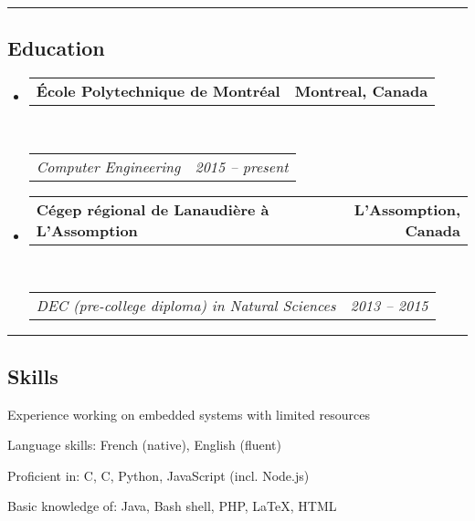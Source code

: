 \documentclass[11pt,a4paper]{article}
\makeatletter
\newenvironment{indentsection}[1]%
{\begin{list}{}%
	{\setlength{\leftmargin}{#1}}%
	\item[]%
}
{\end{list}}
\newcommand{\headerrow}[2]
{\begin{tabular*}{\linewidth}{l@{\extracolsep{\fill}}r}
	#1 &
	#2 \\
\end{tabular*}}
\newcommand{\Cplusplus}
{C\nolinebreak[4]\hspace{-.05em}\raisebox{.22ex}{\footnotesize\bf ++}}
\makeatother
\begin{document}
\hrule
\vspace{-0.4em}
\subsection*{Education}

\begin{itemize}
	\parskip=0.1em

	\item 
	\headerrow
		{\textbf{École Polytechnique de Montréal}}
		{\textbf{Montreal, Canada}}
	\\
	\headerrow
		{\emph{Computer Engineering}}
		{\emph{2015 -- present}}
	
	\item 
	\headerrow
		{\textbf{Cégep régional de Lanaudière à L'Assomption}}
		{\textbf{L'Assomption, Canada}}
	\\
	\headerrow
		{\emph{DEC (pre-college diploma) in Natural Sciences}}
		{\emph{2013 -- 2015}}

\end{itemize}


\hrule
\vspace{-0.4em}
\subsection*{Skills}

\begin{indentsection}{\parindent}
\begin{description*}
	\item[Experience working on embedded systems with limited resources]
	\item[Language skills:]
	French (native), English (fluent)
	\item[Proficient in:]
	C, \Cplusplus, Python, JavaScript (incl. Node.js)
	\item[Basic knowledge of:]
	Java, Bash shell, PHP, \LaTeX, HTML
\end{description*}
\end{indentsection}
\end{document}
